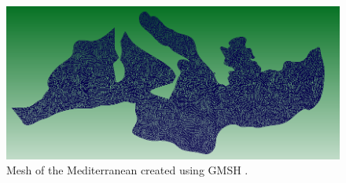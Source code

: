 \begin{figure}
  \begin{center}
    \includegraphics[scale=0.5]{MediterraneanMesh.png}
    \caption{Mesh of the Mediterranean created using GMSH \cite{GMSH}.}
    \label{fig:MedMesh}
  \end{center}
\end{figure}

